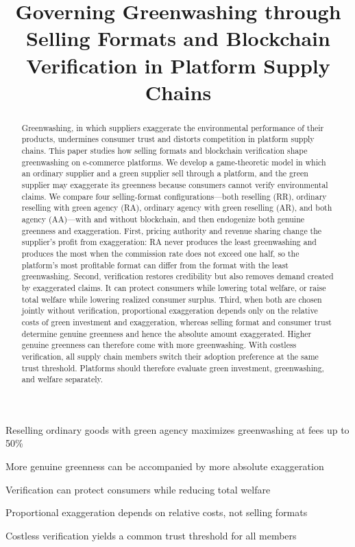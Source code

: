 \documentclass[preprint,review,12pt,authoryear,nopreprintline]{elsarticle}
\theoremstyle{definition}
\begin{document}
\begin{frontmatter}

\title{Governing Greenwashing through Selling Formats and Blockchain Verification in Platform Supply Chains}

\begin{abstract}
Greenwashing, in which suppliers exaggerate the environmental performance of their products, undermines consumer trust and distorts competition in platform supply chains. This paper studies how selling formats and blockchain verification shape greenwashing on e-commerce platforms. We develop a game-theoretic model in which an ordinary supplier and a green supplier sell through a platform, and the green supplier may exaggerate its greenness because consumers cannot verify environmental claims. We compare four selling-format configurations---both reselling (RR), ordinary reselling with green agency (RA), ordinary agency with green reselling (AR), and both agency (AA)---with and without blockchain, and then endogenize both genuine greenness and exaggeration. First, pricing authority and revenue sharing change the supplier's profit from exaggeration: RA never produces the least greenwashing and produces the most when the commission rate does not exceed one half, so the platform's most profitable format can differ from the format with the least greenwashing. Second, verification restores credibility but also removes demand created by exaggerated claims. It can protect consumers while lowering total welfare, or raise total welfare while lowering realized consumer surplus. Third, when both are chosen jointly without verification, proportional exaggeration depends only on the relative costs of green investment and exaggeration, whereas selling format and consumer trust determine genuine greenness and hence the absolute amount exaggerated. Higher genuine greenness can therefore come with more greenwashing. With costless verification, all supply chain members switch their adoption preference at the same trust threshold. Platforms should therefore evaluate green investment, greenwashing, and welfare separately.
\end{abstract}

\begin{highlights}
\item Reselling ordinary goods with green agency maximizes greenwashing at fees up to 50\%
\item More genuine greenness can be accompanied by more absolute exaggeration
\item Verification can protect consumers while reducing total welfare
\item Proportional exaggeration depends on relative costs, not selling formats
\item Costless verification yields a common trust threshold for all members
\end{highlights}


\end{frontmatter}
\end{document}
